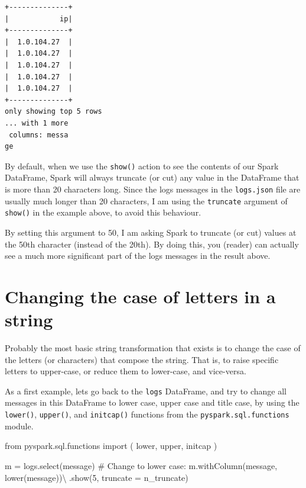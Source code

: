 \documentclass[
  11pt,
  letterpaper,
  DIV=11,
  numbers=noendperiod]{scrreprt}
\newenvironment{Shaded}{\begin{snugshade}}{\end{snugshade}}
\newcommand{\CommentTok}[1]{\textcolor[rgb]{0.37,0.37,0.37}{#1}}
\newcommand{\DecValTok}[1]{\textcolor[rgb]{0.68,0.00,0.00}{#1}}
\newcommand{\ImportTok}[1]{\textcolor[rgb]{0.00,0.46,0.62}{#1}}
\newcommand{\NormalTok}[1]{\textcolor[rgb]{0.00,0.23,0.31}{#1}}
\newcommand{\OperatorTok}[1]{\textcolor[rgb]{0.37,0.37,0.37}{#1}}
\newcommand{\StringTok}[1]{\textcolor[rgb]{0.13,0.47,0.30}{#1}}
\begin{document}
\begin{verbatim}
+--------------+
|            ip|
+--------------+
|  1.0.104.27  |
|  1.0.104.27  |
|  1.0.104.27  |
|  1.0.104.27  |
|  1.0.104.27  |
+--------------+
only showing top 5 rows
... with 1 more
 columns: messa
ge
\end{verbatim}

By default, when we use the \texttt{show()} action to see the contents
of our Spark DataFrame, Spark will always truncate (or cut) any value in
the DataFrame that is more than 20 characters long. Since the logs
messages in the \texttt{logs.json} file are usually much longer than 20
characters, I am using the \texttt{truncate} argument of \texttt{show()}
in the example above, to avoid this behaviour.

By setting this argument to 50, I am asking Spark to truncate (or cut)
values at the 50th character (instead of the 20th). By doing this, you
(reader) can actually see a much more significant part of the logs
messages in the result above.

\section{Changing the case of letters in a
string}\label{changing-the-case-of-letters-in-a-string}

Probably the most basic string transformation that exists is to change
the case of the letters (or characters) that compose the string. That
is, to raise specific letters to upper-case, or reduce them to
lower-case, and vice-versa.

As a first example, lets go back to the \texttt{logs} DataFrame, and try
to change all messages in this DataFrame to lower case, upper case and
title case, by using the \texttt{lower()}, \texttt{upper()}, and
\texttt{initcap()} functions from the \texttt{pyspark.sql.functions}
module.

\begin{Shaded}
\begin{Highlighting}[]
\ImportTok{from}\NormalTok{ pyspark.sql.functions }\ImportTok{import}\NormalTok{ (}
\NormalTok{    lower,}
\NormalTok{    upper,}
\NormalTok{    initcap}
\NormalTok{)}

\NormalTok{m }\OperatorTok{=}\NormalTok{ logs.select(}\StringTok{\textquotesingle{}message\textquotesingle{}}\NormalTok{)}
\CommentTok{\# Change to lower case:}
\NormalTok{m.withColumn(}\StringTok{\textquotesingle{}message\textquotesingle{}}\NormalTok{, lower(}\StringTok{\textquotesingle{}message\textquotesingle{}}\NormalTok{))}\OperatorTok{\textbackslash{}}
\NormalTok{    .show(}\DecValTok{5}\NormalTok{, truncate }\OperatorTok{=}\NormalTok{ n\_truncate)}
\end{Highlighting}
\end{Shaded}
\end{document}
